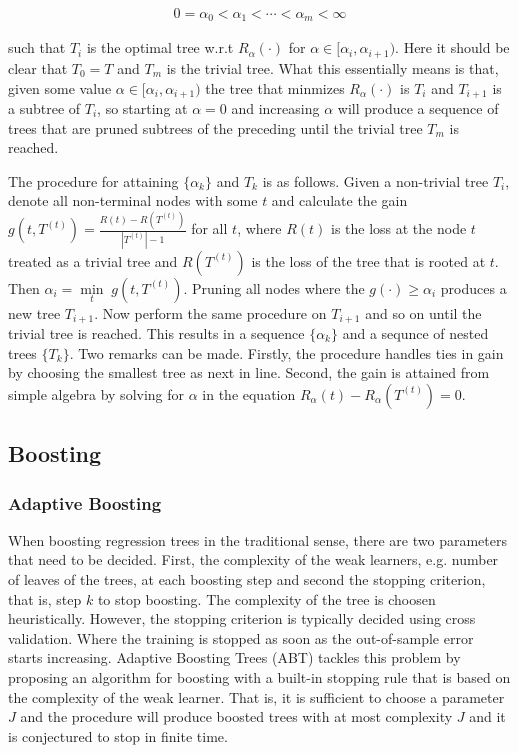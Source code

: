 \documentclass{article}
\theoremstyle{definition} \newtheorem{definition}[theorem]{Definition}
\theoremstyle{remark} \newtheorem{remark}[theorem]{Remark}
\begin{document}
\begin{align}
 0 = \alpha_0 < \alpha_1 < \cdots < \alpha_m < \infty 
\end{align}

such that $ T_i $ is the optimal  tree w.r.t $ R_{\alpha}(\cdot) $ for $ \alpha \in [\alpha_i,
\alpha_{i+1}) $. Here it should be clear that $ T_0 = T $ and $ T_m $ is the
trivial tree. What this essentially means is that, given some value $ \alpha \in [\alpha_i,
\alpha_{i+1}) $ the tree that minmizes $ R_{\alpha}(\cdot) $ is $ T_i $ and $ T_{i+1} $ is a subtree of $
T_i $, so starting at $ \alpha = 0 $ and increasing $ \alpha $ will produce a
sequence of trees that are pruned subtrees of the preceding until the trivial tree
$ T_m $ is reached.

The procedure for attaining $ \{\alpha_k \} $ and $ T_k $ is as follows. Given a non-trivial
tree $ T_i $, denote all non-terminal nodes with some $ t $ and calculate the 
gain $ g(t, T^{(t)}) = \frac{R(t) - R(T^{(t)})}{|T^{(t)}| - 1} $ for all $ t $, where $ R(t) $ is
the loss at the node $ t $ treated as a trivial tree and $ R(T^{(t)}) $ is the
loss of the tree that is rooted at $ t $. Then $\alpha_i = \underset{t}\min \; 
g(t,T^{(t)})$. Pruning all nodes where the $ g(\cdot) \geq  \alpha_i $ produces a new
tree $ T_{i+1} $. Now perform the same procedure on $ T_{i+1} $ and so on until
the trivial tree is reached. This results in a sequence $ \{\alpha_k \} $ and a
sequnce of nested trees $ \{ T_k \} $. Two remarks can be made. Firstly, the procedure
handles ties in gain by choosing the smallest tree as next in line. Second, the
gain is attained from simple algebra by solving for $ \alpha $ in the equation
$R_{\alpha}(t) - R_{\alpha}(T^{(t)}) = 0 $.


\subsection{Boosting}

\subsubsection{Adaptive Boosting}

When boosting regression trees in the traditional sense, there are two
parameters that need to be decided. First, the complexity of the weak learners,
e.g. number of leaves of the trees, at each boosting step and second the
stopping criterion, that is, step $ k $ to stop boosting. The complexity of the
tree is choosen heuristically. However, the stopping criterion is typically
decided using cross validation. Where the training is stopped as soon as the
out-of-sample error starts increasing. Adaptive Boosting Trees (ABT) tackles this
problem by proposing an algorithm for boosting with a built-in stopping rule
that is based on the complexity of the weak learner. That is, it is sufficient
to choose a parameter $ J $ and the procedure will produce boosted trees with at
most complexity $ J $ and it is conjectured to stop in finite time. 
\end{document}

